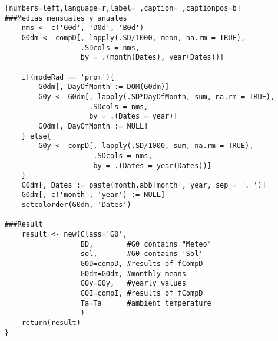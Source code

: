 \begin{lstlisting}[numbers=left,language=r,label= ,caption= ,captionpos=b]
###Medias mensuales y anuales
    nms <- c('G0d', 'D0d', 'B0d')
    G0dm <- compD[, lapply(.SD/1000, mean, na.rm = TRUE),
                  .SDcols = nms,
                  by = .(month(Dates), year(Dates))]

    if(modeRad == 'prom'){
        G0dm[, DayOfMonth := DOM(G0dm)]
        G0y <- G0dm[, lapply(.SD*DayOfMonth, sum, na.rm = TRUE),
                    .SDcols = nms,
                    by = .(Dates = year)]
        G0dm[, DayOfMonth := NULL]        
    } else{
        G0y <- compD[, lapply(.SD/1000, sum, na.rm = TRUE),
                     .SDcols = nms,
                     by = .(Dates = year(Dates))]
    }
    G0dm[, Dates := paste(month.abb[month], year, sep = '. ')]
    G0dm[, c('month', 'year') := NULL]
    setcolorder(G0dm, 'Dates')

###Result
    result <- new(Class='G0',
                  BD,        #G0 contains "Meteo"
                  sol,       #G0 contains 'Sol'
                  G0D=compD, #results of fCompD
                  G0dm=G0dm, #monthly means
                  G0y=G0y,   #yearly values
                  G0I=compI, #results of fCompD
                  Ta=Ta      #ambient temperature
                  )
    return(result)
}
\end{lstlisting}


